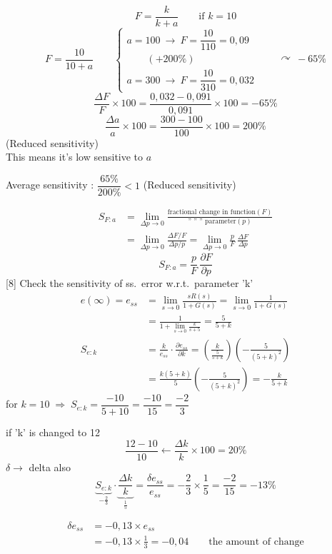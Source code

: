 \documentclass[11pt,a4paper]{article}
\begin{document}
\begin{ornek}
\[ F=\frac{k}{k+a}\qquad\text{if }k=10 \]
\[
F=\frac{10}{10+a}\qquad
\begin{cases}
a=100\ \rightarrow\ F=\dfrac{10}{110}=0{,}09\\[4pt]
\qquad(+200\%)\\[4pt]
a=300\ \rightarrow\ F=\dfrac{10}{310}=0{,}032
\end{cases}
\qquad\curvearrowright\ -65\%
\]
\[ \frac{\Delta F}{F}\times100=\frac{0{,}032-0{,}091}{0{,}091}\times100=-65\% \]
\[ \frac{\Delta a}{a}\times100=\frac{300-100}{100}\times100=200\% \]
(Reduced sensitivity)\\
This means it's low sensitive to $a$

Average sensitivity : $\dfrac{65\%}{200\%}<1$ \quad (Reduced sensitivity)
\end{ornek}
\begin{align*}
S_{F:a}&=\lim_{\Delta p\to0}\frac{\text{fractional change in function}(F)}{\text{''\ ''\ ''\ parameter}(p)}\\[6pt]
&=\lim_{\Delta p\to0}\frac{\Delta F/F}{\Delta p/p}=\lim_{\Delta p\to0}\frac{p}{F}\,\frac{\Delta F}{\Delta p}
\end{align*}
\[ S_{F:a}=\frac{p}{F}\,\frac{\partial F}{\partial p} \]
[8]
Check the sensitivity of ss.\ error w.r.t.\ parameter 'k'
\begin{align*}
e(\infty)=e_{ss}&=\lim_{s\to0}\frac{sR(s)}{1+G(s)}=\lim_{s\to0}\frac{1}{1+G(s)}\\[6pt]
&=\frac{1}{1+\lim\limits_{s\to0}\frac{k}{s+5}}=\frac{5}{5+k}\\[10pt]
S_{e:k}&=\frac{k}{e_{ss}}\cdot\frac{\partial e_{ss}}{\partial k}=\left(\frac{k}{\frac{5}{5+k}}\right)\left(-\frac{5}{(5+k)^{2}}\right)\\[8pt]
&=\frac{k(5+k)}{5}\left(-\frac{5}{(5+k)^{2}}\right)=-\frac{k}{5+k}
\end{align*}
for $k=10\;\Rightarrow\;S_{e:k}=\dfrac{-10}{5+10}=\dfrac{-10}{15}=\dfrac{-2}{3}$

if 'k' is changed to 12
\[ \frac{12-10}{10}\leftarrow\frac{\Delta k}{k}\times100=20\% \]
$\delta\rightarrow$ delta also
\[
\underbrace{S_{e:k}}_{-\frac{2}{3}}\cdot\underbrace{\frac{\Delta k}{k}}_{\frac{1}{5}}=\frac{\delta e_{ss}}{e_{ss}}=-\frac{2}{3}\times\frac{1}{5}=\frac{-2}{15}=-13\%
\]

\begin{align*}
\delta e_{ss}&=-0{,}13\times e_{ss}\\
&=-0{,}13\times\frac{1}{3}=-0{,}04\qquad\text{the amount of change}
\end{align*}
\end{document}
